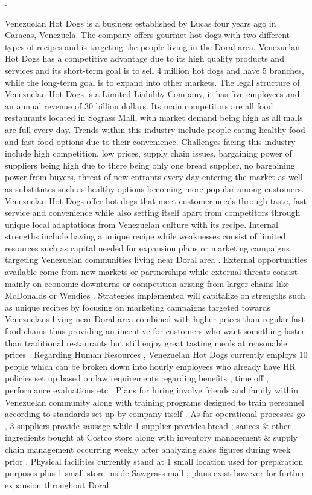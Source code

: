 .

Venezuelan Hot Dogs is a business established by Lucas four years ago in Caracas, Venezuela. The company offers gourmet hot dogs with two different types of recipes and is targeting the people living in the Doral area. Venezuelan Hot Dogs has a competitive advantage due to its high quality products and services and its short-term goal is to sell 4 million hot dogs and have 5 branches, while the long-term goal is to expand into other markets. 
The legal structure of Venezuelan Hot Dogs is a Limited Liability Company, it has five employees and an annual revenue of 30 billion dollars. Its main competitors are all food restaurants located in Sograss Mall, with market demand being high as all malls are full every day. Trends within this industry include people eating healthy food and fast food options due to their convenience. Challenges facing this industry include high competition, low prices, supply chain issues, bargaining power of suppliers being high due to there being only one bread supplier, no bargaining power from buyers, threat of new entrants every day entering the market as well as substitutes such as healthy options becoming more popular among customers. 
Venezuelan Hot Dogs offer hot dogs that meet customer needs through taste, fast service and convenience while also setting itself apart from competitors through unique local adaptations from Venezuelan culture with its recipe. Internal strengths include having a unique recipe while weaknesses consist of limited resources such as capital needed for expansion plans or marketing campaigns targeting Venezuelan communities living near Doral area . External opportunities available come from new markets or partnerships while external threats consist mainly on economic downturns or competition arising from larger chains like McDonalds or Wendies . Strategies implemented will capitalize on strengths such as unique recipes by focusing on marketing campaigns targeted towards Venezuelans living near Doral area combined with higher prices than regular fast food chains thus providing an incentive for customers who want something faster than traditional restaurants but still enjoy great tasting meals at reasonable prices . 
Regarding Human Resources , Venezuelan Hot Dogs currently employs 10 people which can be broken down into hourly employees who already have HR policies set up based on law requirements regarding benefits , time off , performance evaluations etc . Plans for hiring involve friends and family within Venezuelan community along with training programs designed to train personnel according to standards set up by company itself . As far operational processes go , 3 suppliers provide sausage while 1 supplier provides bread ; sauces & other ingredients bought at Costco store along with inventory management & supply chain management occurring weekly after analyzing sales figures during week prior . Physical facilities currently stand at 1 small location used for preparation purposes plus 1 small store inside Sawgrass mall ; plans exist however for further expansion throughout Doral  
